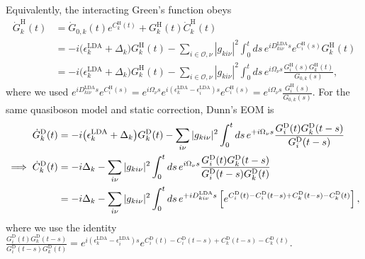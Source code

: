 Equivalently, the interacting Green's function obeys
\begin{align}
\dot G^{\mathrm H}_k(t)
&=\dot G_{0,k}(t)e^{C^{\mathrm H}_k(t)}+G^{\mathrm H}_k(t)\dot C^{\mathrm H}_k(t) \\
&=-i\bigl(\epsilon_k^{\mathrm{LDA}}+\Delta_k\bigr)G^{\mathrm H}_k(t)
-\sum_{i\in\mathcal O,\nu}|g_{ki\nu}|^2
\int_0^t ds\,
e^{iD_{ki\nu}^{\mathrm{LDA}}s}e^{C^{\mathrm H}_i(s)}G^{\mathrm H}_k(t)
\\
&=-i\bigl(\epsilon_k^{\mathrm{LDA}}+\Delta_k\bigr)G^{\mathrm H}_k(t)
-\sum_{i\in\mathcal O,\nu}|g_{ki\nu}|^2
\int_0^t ds\,e^{i\Omega_\nu s}
\frac{G^{\mathrm H}_i(s)G^{\mathrm H}_k(t)}{G_{0,k}(s)},
\label{eq:holm_gdot_fixed_exchange}
\end{align}
where we used $e^{iD_{ki\nu}^{\mathrm{LDA}}s}e^{C^{\mathrm H}_i(s)}=e^{i\Omega_\nu s}
e^{i(\epsilon_k^{\mathrm{LDA}}-\epsilon_i^{\mathrm{LDA}})s}
e^{C^{\mathrm H}_i(s)}
=e^{i\Omega_\nu s}\frac{G^{\mathrm H}_i(s)}{G_{0,k}(s)}$.
For the same quasiboson model and static correction, Dunn's EOM is
\begin{align}
    {
    \dot G_k^{\rm D}}(t)
    &=
    -i\bigl(\epsilon_k^{\mathrm{LDA}}+\Delta_k\bigr)G^{\rm D}_k(t)
    -
    \sum_{i\nu}|g_{ki\nu}|^2
    \int_0^t ds\,e^{+i\Omega_\nu s}
    \frac{G^{\rm D}_i(t)G^{\mathrm{D}}_k(t-s)}{G^{\mathrm{D}}_i(t-s)}
    \label{eq:pj_gdot_fixed_exchange} \\
\implies \dot C_k^{\mathrm D}(t)
&=-i\Delta_k
-\sum_{i\nu}|g_{ki\nu}|^2
\int_0^t ds\,e^{i\Omega_\nu s}
\frac{G_i^{\mathrm D}(t)G_k^{\mathrm D}(t-s)}
     {G_i^{\mathrm D}(t-s)G_k^{\mathrm D}(t)} \\
    &=
    -i\Delta_k
    -
    \sum_{i\nu}|g_{ki\nu}|^2
    \int_0^t ds\,
    e^{+iD_{ki\nu}^{\mathrm{LDA}}s} \left[
    e^{C^{\mathrm{D}}_i(t)-C^{\mathrm{D}}_i(t-s)+C^{\mathrm{D}}_k(t-s)-C^{\mathrm{D}}_k(t)} \right],
    \label{eq:pj_cdot_fixed_exchange}
\end{align}
where we use the identity $\frac{G_i^{\mathrm D}(t)G_k^{\mathrm D}(t-s)}
     {G_i^{\mathrm D}(t-s)G_k^{\mathrm D}(t)}=
e^{i(\epsilon_k^{\mathrm{LDA}}-\epsilon_i^{\mathrm{LDA}})s}
e^{C_i^{\mathrm D}(t)-C_i^{\mathrm D}(t-s)
  +C_k^{\mathrm D}(t-s)-C_k^{\mathrm D}(t)}$. 
